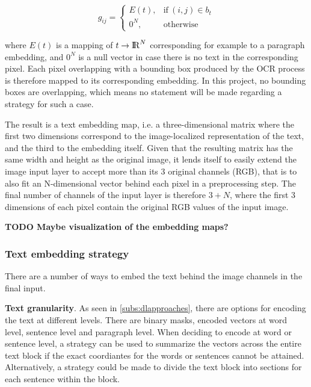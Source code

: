 \documentclass[oneside, english, bibtex]{kththesis}
\begin{document}
\begin{equation}
	g_{ij} =
	    \begin{cases}
	      E(t), & \text{if}\ (i,j) \in b_t \\
	      0^N, & \text{otherwise}
	    \end{cases}
  	\label{eqn:textembedding}
\end{equation}

where $E(t)$ is a mapping of $t \rightarrow {\rm I\!R}^N$ corresponding for example to a paragraph embedding, and $0^N$ is a null vector in case there is no text in the corresponding pixel. Each pixel overlapping with a bounding box produced by the OCR process is therefore mapped to its corresponding embedding. In this project, no bounding boxes are overlapping, which means no statement will be made regarding a strategy for such a case.

The result is a text embedding map, i.e. a three-dimensional matrix where the first two dimensions correspond to the image-localized representation of the text, and the third to the embedding itself. Given that the resulting matrix has the same width and height as the original image, it lends itself to easily extend the image input layer to accept more than its 3 original channels (RGB), that is to also fit an N-dimensional vector behind each pixel in a preprocessing step. The final number of channels of the input layer is therefore $3+N$, where the first 3 dimensions of each pixel contain the original RGB values of the input image.

\textbf{TODO Maybe visualization of the embedding maps?}

\subsubsection{Text embedding strategy}

There are a number of ways to embed the text behind the image channels in the final input.

\textbf{Text granularity}. As seen in \autoref{subs:dlapproaches}, there are options for encoding the text at different levels. There are binary masks, encoded vectors at word level, sentence level and paragraph level. When deciding to encode at word or sentence level, a strategy can be used to summarize the vectors across the entire text block if the exact coordiantes for the words or sentences cannot be attained. Alternatively, a strategy could be made to divide the text block into sections for each sentence within the block. 
\end{document}
